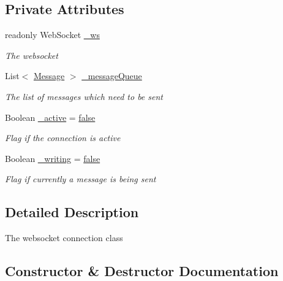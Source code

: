 \subsection*{Private Attributes}
\begin{DoxyCompactItemize}
\item 
readonly Web\+Socket \hyperlink{class_web_analyzer_1_1_server_1_1_websocket_connection_a8b3efea13ab70fe8a5c866930ef7a263}{\+\_\+ws}
\begin{DoxyCompactList}\small\item\em The websocket \end{DoxyCompactList}\item 
List$<$ \hyperlink{class_web_analyzer_1_1_models_1_1_message_model_1_1_message}{Message} $>$ \hyperlink{class_web_analyzer_1_1_server_1_1_websocket_connection_a876416b6c825d37d39ec966b022883b3}{\+\_\+message\+Queue}
\begin{DoxyCompactList}\small\item\em The list of messages which need to be sent \end{DoxyCompactList}\item 
Boolean \hyperlink{class_web_analyzer_1_1_server_1_1_websocket_connection_aad4b4619cdb766c16e900ee792fd2fc8}{\+\_\+active} = \hyperlink{_u_i_2_h_t_m_l_resources_2js_2src_2export_8js_ae6c865df784842196d411c1466b01686}{false}
\begin{DoxyCompactList}\small\item\em Flag if the connection is active \end{DoxyCompactList}\item 
Boolean \hyperlink{class_web_analyzer_1_1_server_1_1_websocket_connection_a19b519a7ec81f0898724fcdefb8c6f62}{\+\_\+writing} = \hyperlink{_u_i_2_h_t_m_l_resources_2js_2src_2export_8js_ae6c865df784842196d411c1466b01686}{false}
\begin{DoxyCompactList}\small\item\em Flag if currently a message is being sent \end{DoxyCompactList}\end{DoxyCompactItemize}


\subsection{Detailed Description}
The websocket connection class 



\subsection{Constructor \& Destructor Documentation}
\hypertarget{class_web_analyzer_1_1_server_1_1_websocket_connection_af4ada0b7f2d032ad42da1d9238619ebd}{}

